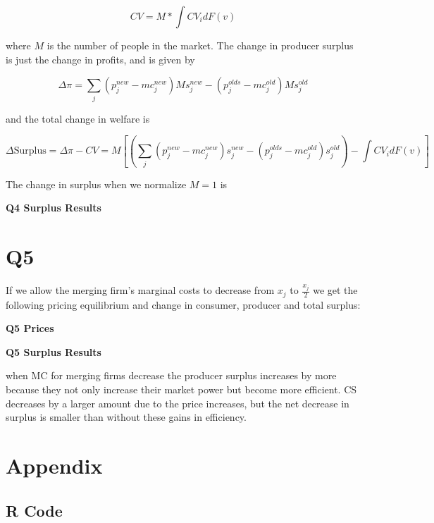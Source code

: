 \documentclass{article}
\newcommand{\1}{\mathbbm{1}}
\begin{document}
$$CV = M*\int CV_i dF(v)$$

where $M$ is the number of people in the market. The change in producer surplus is just the change in profits, and is given by 

$$\Delta \pi = \sum_j (p_j^{new} - mc_j^{new})Ms_j^{new} - (p_j^{olds} - mc_j^{old})Ms_j^{old}$$

and the total change in welfare is 

$$\Delta \text{Surplus} = \Delta \pi - CV = M[(\sum_j (p_j^{new} - mc_j^{new})s_j^{new} - (p_j^{olds} - mc_j^{old})s_j^{old}) - \int CV_i dF(v)] $$

The change in surplus when we normalize $M = 1$ is 


\begin{center}
	\centering
	\textbf{Q4 Surplus Results}\par\medskip
	\scalebox{1}{
		
	}
\end{center}

\section{Q5}
If we allow the merging firm's marginal costs to decrease from $x_j$ to $\frac{x_j}{2}$ we get the following pricing equilibrium and change in consumer, producer and total surplus:


\begin{center}
	\centering
	\textbf{Q5 Prices}\par\medskip
	\scalebox{1}{
		
	}
\end{center}

\begin{center}
	\centering
	\textbf{Q5 Surplus Results}\par\medskip
	\scalebox{1}{
		
	}
\end{center}

when MC for merging firms decrease the producer surplus increases by more because they not only increase their market power but become more efficient. CS decreases by a larger amount due to the price increases, but the net decrease in surplus is smaller than without these gains in efficiency. 




\section{Appendix}
\subsection{R Code}


\end{document}
